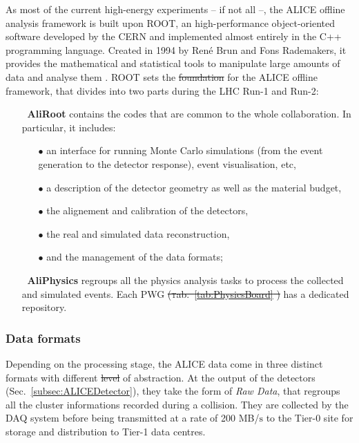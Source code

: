 \documentclass[ALICE,manyauthors]{cernphprep}
\newcommand{\Tab}       {\textsc{t}ab.~}
\newcommand{\tab}       {\Tab}
\newcommand{\Sec}       {\textsc{S}ec.~}
\newcommand {\unitStyle}[1] {\mbox{\ensuremath{\text{#1}}}}
\newcommand {\second}     {\unitStyle{s}\xspace}
\providecommand{\DIFaddtex}[1]{{\protect\color{blue}\uwave{#1}}} %
\providecommand{\DIFdeltex}[1]{{\protect\color{red}\sout{#1}}}                      %
\providecommand{\DIFaddbegin}{} %
\providecommand{\DIFaddend}{} %
\providecommand{\DIFdelbegin}{} %
\providecommand{\DIFdelend}{} %
\providecommand{\DIFadd}[1]{\texorpdfstring{\DIFaddtex{#1}}{#1}} %
\providecommand{\DIFdel}[1]{\texorpdfstring{\DIFdeltex{#1}}{}} %
\newcommand{\DIFscaledelfig}{0.5}
\newlength{\DIFdelgraphicswidth} %
\newlength{\DIFdelgraphicsheight} %
\newcommand{\DIFaddincludegraphics}[2][]{{\color{blue}\fbox{\DIFOincludegraphics[#1]{#2}}}} %
\newcommand{\DIFdelincludegraphics}[2][]{%
\sbox{\DIFdelgraphicsbox}{\DIFOincludegraphics[#1]{#2}}%
\settoboxwidth{\DIFdelgraphicswidth}{\DIFdelgraphicsbox} %
\settoboxtotalheight{\DIFdelgraphicsheight}{\DIFdelgraphicsbox} %
\scalebox{\DIFscaledelfig}{%
\parbox[b]{\DIFdelgraphicswidth}{\usebox{\DIFdelgraphicsbox}\\[-\baselineskip] \rule{\DIFdelgraphicswidth}{0em}}\llap{\resizebox{\DIFdelgraphicswidth}{\DIFdelgraphicsheight}{%
\setlength{\unitlength}{\DIFdelgraphicswidth}%
\begin{picture}(1,1)%
\thicklines\linethickness{2pt} %
{\color[rgb]{1,0,0}\put(0,0){\framebox(1,1){}}}%
{\color[rgb]{1,0,0}\put(0,0){\line( 1,1){1}}}%
{\color[rgb]{1,0,0}\put(0,1){\line(1,-1){1}}}%
\end{picture}%
}\hspace*{3pt}}} %
} %
\DeclareRobustCommand{\DIFaddbegin}{\DIFOaddbegin \let\includegraphics\DIFaddincludegraphics} %
\DeclareRobustCommand{\DIFaddend}{\DIFOaddend \let\includegraphics\DIFOincludegraphics} %
\DeclareRobustCommand{\DIFdelbegin}{\DIFOdelbegin \let\includegraphics\DIFdelincludegraphics} %
\DeclareRobustCommand{\DIFdelend}{\DIFOaddend \let\includegraphics\DIFOincludegraphics} %
\begin{document}
As most of the current high-energy experiments -- if not all --, the ALICE offline analysis framework is built upon ROOT, an high-performance object-oriented software developed by the CERN and implemented almost entirely in the C++ programming language. Created in 1994 by René Brun and Fons Rademakers, it provides the mathematical and statistical tools to manipulate large amounts of data and analyse them \cite{renebrunandfonsrademakersROOTObjectOriented}. ROOT sets the \DIFdelbegin \DIFdel{foundation }\DIFdelend \DIFaddbegin \DIFadd{foundations }\DIFaddend for the ALICE offline framework, that divides into two parts during the LHC Run-1 and Run-2:
\begin{itemize}
\item[$\ $] \textbf{AliRoot} \cite{alicecollaborationAliRoot} contains the codes that are common to the whole collaboration. In particular, it includes:
\begin{itemize}
\item[$\bullet$] an interface for running Monte Carlo simulations (from the event generation to the detector response), event visualisation, etc,
\item[$\bullet$] a description of the detector geometry as well as the material budget,
\item[$\bullet$] the alignement and calibration of the detectors, 
\item[$\bullet$] the real and simulated data reconstruction,
\item[$\bullet$] and the management of the data formats;
\end{itemize}
\item[$\ $] \textbf{AliPhysics} \cite{alicecollaborationAliPhysics2023} regroups all the physics analysis tasks to process the collected and simulated events. Each PWG \DIFdelbegin \DIFdel{(\tab\ref{tab:PhysicsBoard} ) }\DIFdelend \DIFaddbegin \DIFadd{in \tab\ref{tab:PhysicsBoard} }\DIFaddend has a dedicated repository.
\end{itemize}

\subsubsection{Data formats}
\label{subsubsec:DataFormats}

Depending on the processing stage, the ALICE data come in three distinct formats with different \DIFdelbegin \DIFdel{level }\DIFdelend \DIFaddbegin \DIFadd{levels }\DIFaddend of abstraction. At the output of the detectors (\Sec\ref{subsec:ALICEDetector}), they take the form of \textit{Raw Data}, that regroups all the cluster informations recorded during a collision. They are collected by the DAQ system before being transmitted at a rate of 200 MB/\second to the Tier-0 site for storage and distribution to Tier-1 data centres. 
\end{document}
